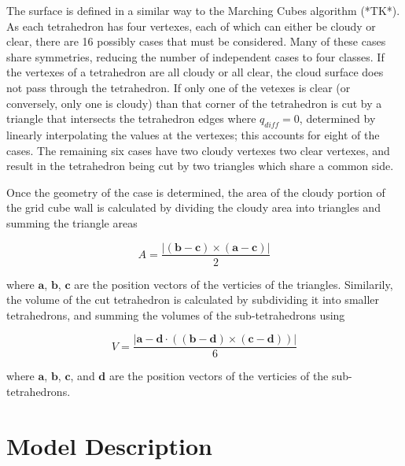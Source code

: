 \documentclass[12pt]{article}
\begin{document}
The surface is defined in a similar way to the Marching Cubes algorithm 
(*TK*).  As each tetrahedron has four vertexes, each of which can either be 
cloudy or clear, there are 16 possibly cases that must be considered.  Many of 
these cases share symmetries, reducing the number of independent cases to four 
classes.  If the vertexes of a tetrahedron are all cloudy or all clear, the 
cloud surface does not pass through the tetrahedron.  If only one of the 
vetexes is clear (or conversely, only one is cloudy) than that corner of the 
tetrahedron is cut by a triangle that intersects the tetrahedron edges where 
$q_{diff}=0$, determined by linearly interpolating the values at the vertexes; 
this accounts for eight of the cases.  The remaining six cases have two cloudy 
vertexes two clear vertexes, and result in the tetrahedron being cut by two 
triangles which share a common side.

Once the geometry of the case is determined, the area of the cloudy portion of
the grid cube wall is calculated by dividing the cloudy area into triangles and 
summing the triangle areas

\begin{equation}
A = \frac{|(\mathbf{b - c}) \times (\mathbf{a - c})|}{2}
\end{equation}

where $\mathbf{a}$, $\mathbf{b}$, $\mathbf{c}$ are the position vectors of the 
verticies of the triangles.  Similarily, the volume of the cut tetrahedron is 
calculated by subdividing it into smaller tetrahedrons, and summing the volumes 
of the sub-tetrahedrons using

\begin{equation}
V = \frac{|\mathbf{a - d} \cdot ((\mathbf{b - d}) \times (\mathbf{c - d}))|}{6}
\end{equation}

where $\mathbf{a}$, $\mathbf{b}$, $\mathbf{c}$, and $\mathbf{d}$ are the 
position vectors of the verticies of the sub-tetrahedrons.

\section{Model Description}
\end{document}
